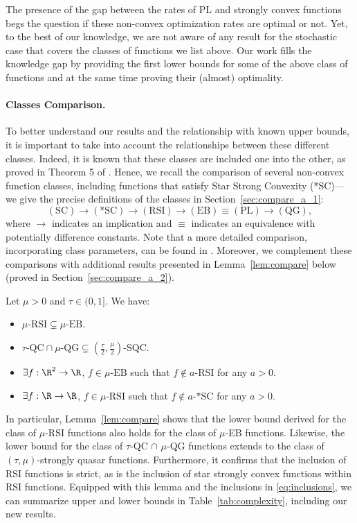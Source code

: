 	The presence of the gap between the rates of PL and strongly convex functions begs the question if these non-convex optimization rates are optimal or not.
	Yet, to the best of our knowledge, we are not aware of any result for the stochastic case that covers the classes of functions we list above. Our work fills the knowledge gap by providing the first lower bounds for some of the above class of functions and at the same time proving their (almost) optimality.
	
	\paragraph{Classes Comparison.}
	To better understand our results and the relationship with known upper bounds, it is important to take into account the relationships between these different classes. Indeed, it is known that these classes are included one into the other, as proved in Theorem 5 of \citet{karimi2016linear}.
	Hence, we recall the comparison of several non-convex function classes,
	including functions that satisfy Star Strong Convexity (*SC)---we give the precise definitions of the classes in Section~\ref{sec:compare_a_1}:
	\begin{equation}\label{eq:inclusions}
		(\text{SC}) 
		\rightarrow 
		(\text{*SC}) 
		\rightarrow 
		(\text{RSI}) 
		\rightarrow 
		(\text{EB}) \equiv (\text{PL}) 
		\rightarrow 
		(\text{QG}),
	\end{equation}
	where $\rightarrow$ indicates an implication and $\equiv$ indicates an equivalence with potentially difference constants. Note that a more detailed comparison, incorporating class parameters, can be found in \cite{guille2021study}. Moreover, we complement these comparisons with additional results presented in Lemma~\ref{lem:compare} below (proved in Section~\ref{sec:compare_a_2}).
	\begin{lemma}\label{lem:compare}
		Let $\mu >0$ and $\tau \in (0,1]$. We have:
		\begin{itemize}
			\item $\mu\text{-RSI} \subsetneq \mu\text{-EB}$.
			\item $\tau\text{-QC} \cap \mu\text{-QG} \subsetneq (\frac{\tau}{2}, \frac{\mu}{2})\text{-SQC}$.
			\item $\exists f:\R^2\rightarrow\R$, $f\in\mu\text{-EB}$ such that $f\notin a\text{-RSI}$ for any $a>0$.
			\item $\exists f:\R\rightarrow\R$, $f\in \mu\text{-RSI}$ such that $f\notin a\text{-*SC}$ for any $a>0$.
		\end{itemize}
	\end{lemma}
	In particular, Lemma~\ref{lem:compare} shows that the lower bound derived for the class of $\mu$-RSI functions also holds for the class of $\mu$-EB functions. Likewise, the lower bound for the class of $\tau$-QC $\cap$ $\mu$-QG  functions extends to the class of $(\tau, \mu)$-strongly quasar functions. Furthermore, it confirms that the inclusion of RSI functions is strict, as is the inclusion of star strongly convex functions within RSI functions. Equipped with this lemma and the inclusions in \eqref{eq:inclusions}, we can summarize  upper and lower bounds in Table~\ref{tab:complexity}, including our new results.
	
